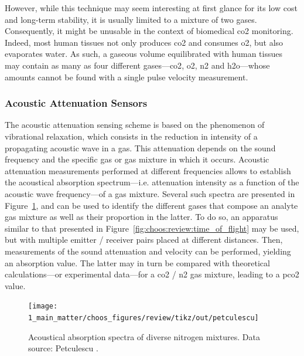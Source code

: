 However, while this technique may seem interesting at first glance for its low cost and long-term stability, it is usually limited to a mixture of two gases\cite{gerlach2019_ch9}. Consequently, it might be unusable in the context of biomedical \gls{co2} monitoring. Indeed, most human tissues not only produces \gls{co2} and consumes \gls{o2}, but also evaporates water. As such, a gaseous volume equilibrated with human tissues may contain as many as four different gases---\gls{co2}, \gls{o2}, \gls{n2} and \gls{h2o}---whose amounts cannot be found with a single pulse velocity measurement.

\subsubsection{Acoustic Attenuation Sensors}\label{subsect:choos:review:acoust_att}

The acoustic attenuation sensing scheme is based on the phenomenon of vibrational relaxation, which consists in the reduction in intensity of a propagating acoustic wave in a gas. This attenuation depends on the sound frequency and the specific gas or gas mixture in which it occurs\cite{evans1972, bass1990}. Acoustic attenuation measurements performed at different frequencies allows to establish the acoustical absorption spectrum---i.e. attenuation intensity as a function of the acoustic wave frequency---of a gas mixture. Several such spectra are presented in Figure~\ref{fig:choos:review:sound_att}, and can be used to identify the different gases that compose an analyte gas mixture as well as their proportion in the latter. To do so, an apparatus similar to that presented in Figure~\ref{fig:choos:review:time_of_flight} may be used, but with multiple emitter / receiver pairs placed at different distances. Then, measurements of the sound attenuation and velocity can be performed, yielding an absorption value. The latter may in turn be compared with theoretical calculations---or experimental data---for a \gls{co2} / \gls{n2} gas mixture, leading to a \gls{pco2} value.

\begin{figure}
	\centering
	\texttt{[image: 1\_main\_matter/choos\_figures/review/tikz/out/petculescu]}
	\caption[Acoustical absorption spectra of diverse nitrogen mixtures.]{Acoustical absorption spectra of diverse nitrogen mixtures. Data source: Petculescu \etal\cite{petculescu2006a}.}
	\label{fig:choos:review:sound_att}
\end{figure}

